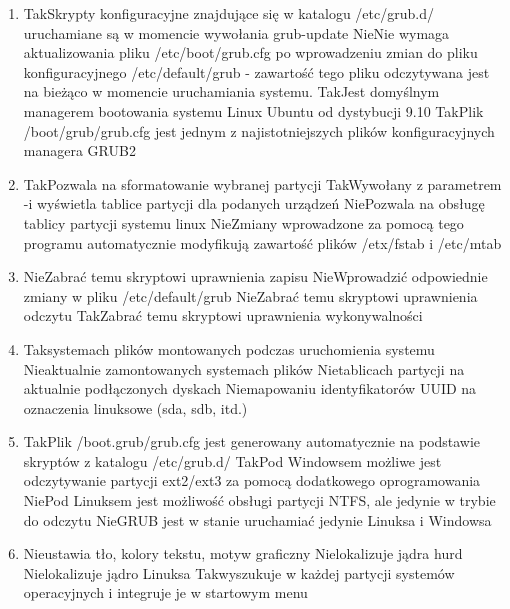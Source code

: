 \begin{enumerate}
	\item {}
	{Tak}{Skrypty konfiguracyjne znajdujące się w katalogu /etc/grub.d/ uruchamiane są w momencie wywołania grub-update}
	{Nie}{Nie wymaga aktualizowania pliku /etc/boot/grub.cfg po wprowadzeniu zmian do pliku konfiguracyjnego /etc/default/grub - zawartość tego pliku odczytywana jest na bieżąco w momencie uruchamiania systemu.}
	{Tak}{Jest domyślnym managerem bootowania systemu Linux Ubuntu od dystybucji 9.10}
	{Tak}{Plik /boot/grub/grub.cfg jest jednym z najistotniejszych plików konfiguracyjnych managera GRUB2}
	
	\newpage
	
	\item {}
	{Tak}{Pozwala na sformatowanie wybranej partycji}
	{Tak}{Wywołany z parametrem -i wyświetla tablice partycji dla podanych urządzeń}
	{Nie}{Pozwala na obsługę tablicy partycji systemu linux}
	{Nie}{Zmiany wprowadzone za pomocą tego programu automatycznie modyfikują zawartość plików /etx/fstab i /etc/mtab}

	\item {}
	{Nie}{Zabrać temu skryptowi uprawnienia zapisu}
	{Nie}{Wprowadzić odpowiednie zmiany w pliku /etc/default/grub}
	{Nie}{Zabrać temu skryptowi uprawnienia odczytu}
	{Tak}{Zabrać temu skryptowi uprawnienia wykonywalności}
	
	\item {}
	{Tak}{systemach plików montowanych podczas uruchomienia systemu}
	{Nie}{aktualnie zamontowanych systemach plików}
	{Nie}{tablicach partycji na aktualnie podłączonych dyskach}
	{Nie}{mapowaniu identyfikatorów UUID na oznaczenia linuksowe (sda, sdb, itd.)}
	
	\item {}
	{Tak}{Plik /boot.grub/grub.cfg jest generowany automatycznie na podstawie skryptów z katalogu /etc/grub.d/}
	{Tak}{Pod Windowsem możliwe jest odczytywanie partycji ext2/ext3 za pomocą dodatkowego oprogramowania}
	{Nie}{Pod Linuksem jest możliwość obsługi partycji NTFS, ale jedynie w trybie do odczytu}
	{Nie}{GRUB jest w stanie uruchamiać jedynie Linuksa i Windowsa}
	
	\item {}
	{Nie}{ustawia tło, kolory tekstu, motyw graficzny}
	{Nie}{lokalizuje jądra hurd}
	{Nie}{lokalizuje jądro Linuksa}
	{Tak}{wyszukuje w każdej partycji systemów operacyjnych i integruje je w startowym menu}


\end{enumerate}
